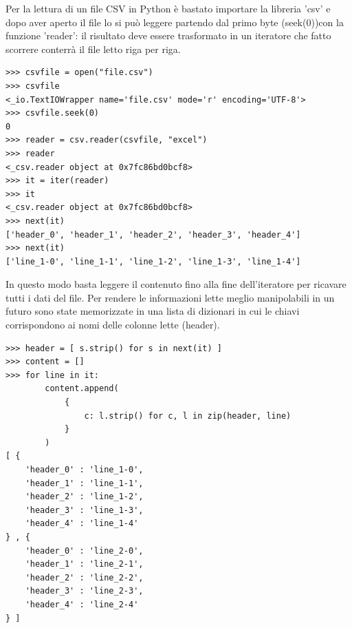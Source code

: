 \documentclass[12pt]{report}
\begin{document}
Per la lettura di un file CSV in Python è bastato importare la libreria 'csv' e dopo aver aperto il file lo si può leggere partendo dal primo byte (seek(0))con la funzione 'reader': il risultato deve essere trasformato in un iteratore che fatto scorrere conterrà il file letto riga per riga.
\begin{lstlisting}[label=codice,caption=Lettura di un file CSV, frame=single]
>>> csvfile = open("file.csv")
>>> csvfile
<_io.TextIOWrapper name='file.csv' mode='r' encoding='UTF-8'>
>>> csvfile.seek(0)
0
>>> reader = csv.reader(csvfile, "excel")
>>> reader
<_csv.reader object at 0x7fc86bd0bcf8>
>>> it = iter(reader)
>>> it
<_csv.reader object at 0x7fc86bd0bcf8>
>>> next(it)
['header_0', 'header_1', 'header_2', 'header_3', 'header_4']
>>> next(it)
['line_1-0', 'line_1-1', 'line_1-2', 'line_1-3', 'line_1-4']
\end{lstlisting}

\vspace{5mm} %

In questo modo basta leggere il contenuto fino alla fine dell'iteratore per ricavare tutti i dati del file. 
Per rendere le informazioni lette meglio manipolabili in un futuro sono state memorizzate in una lista di dizionari in cui le chiavi corrispondono ai nomi delle colonne lette (header).
\begin{lstlisting}[label=codice,caption=Memorizzazione dei dati in un dizionario, frame=single]
>>> header = [ s.strip() for s in next(it) ]
>>> content = []
>>> for line in it:
        content.append(
            {
                c: l.strip() for c, l in zip(header, line)
            }
        )
[ {
    'header_0' : 'line_1-0', 
    'header_1' : 'line_1-1', 
    'header_2' : 'line_1-2', 
    'header_3' : 'line_1-3', 
    'header_4' : 'line_1-4'
} , {
    'header_0' : 'line_2-0', 
    'header_1' : 'line_2-1', 
    'header_2' : 'line_2-2', 
    'header_3' : 'line_2-3', 
    'header_4' : 'line_2-4'
} ]
\end{lstlisting}

\vspace{5mm} %
\end{document}
